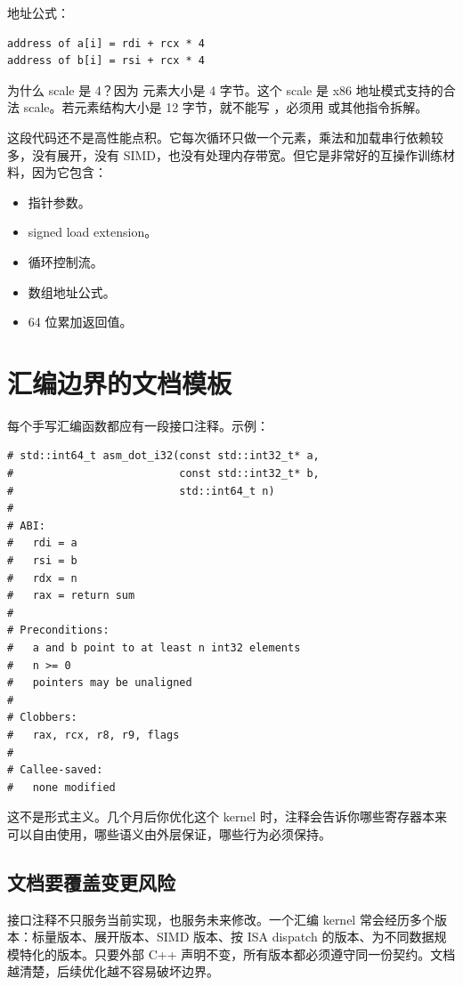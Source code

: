 地址公式：

\begin{lstlisting}
address of a[i] = rdi + rcx * 4
address of b[i] = rsi + rcx * 4
\end{lstlisting}

为什么 scale 是 4？因为  元素大小是 4 字节。这个 scale 是 x86 地址模式支持的合法 scale。若元素结构大小是 12 字节，就不能写 ，必须用  或其他指令拆解。

这段代码还不是高性能点积。它每次循环只做一个元素，乘法和加载串行依赖较多，没有展开，没有 SIMD，也没有处理内存带宽。但它是非常好的互操作训练材料，因为它包含：

\begin{itemize}
  \item 指针参数。
  \item signed load extension。
  \item 循环控制流。
  \item 数组地址公式。
  \item 64 位累加返回值。
\end{itemize}

\section{汇编边界的文档模板}

每个手写汇编函数都应有一段接口注释。示例：

\begin{lstlisting}
# std::int64_t asm_dot_i32(const std::int32_t* a,
#                          const std::int32_t* b,
#                          std::int64_t n)
#
# ABI:
#   rdi = a
#   rsi = b
#   rdx = n
#   rax = return sum
#
# Preconditions:
#   a and b point to at least n int32 elements
#   n >= 0
#   pointers may be unaligned
#
# Clobbers:
#   rax, rcx, r8, r9, flags
#
# Callee-saved:
#   none modified
\end{lstlisting}

这不是形式主义。几个月后你优化这个 kernel 时，注释会告诉你哪些寄存器本来可以自由使用，哪些语义由外层保证，哪些行为必须保持。

\subsection{文档要覆盖变更风险}

接口注释不只服务当前实现，也服务未来修改。一个汇编 kernel 常会经历多个版本：标量版本、展开版本、SIMD 版本、按 ISA dispatch 的版本、为不同数据规模特化的版本。只要外部 C++ 声明不变，所有版本都必须遵守同一份契约。文档越清楚，后续优化越不容易破坏边界。

